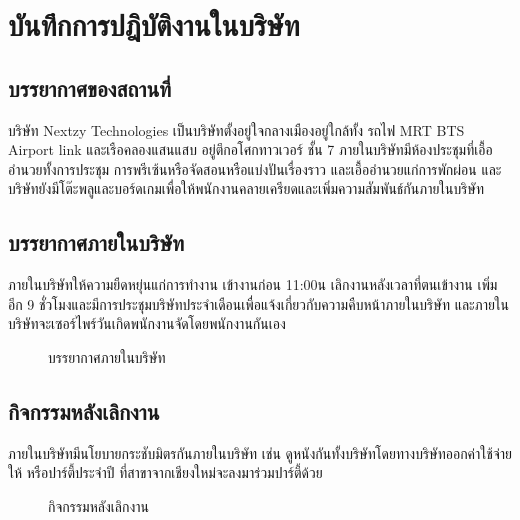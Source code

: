 \chapter{บันทึกการปฎิบัติงานในบริษัท}
\label{chapter:atmosphere}
\section{บรรยากาศของสถานที่}
บริษัท Nextzy Technologies เป็นบริษัทตั้งอยู่ใจกลางเมืองอยู่ใกล้ทั้ง รถไฟ MRT BTS Airport link และเรือคลองแสนแสบ
อยู่ตึกอโศกทาวเวอร์ ชั้น 7 ภายในบริษัทมีห้องประชุมที่เอื้ออำนวยทั้งการประชุม การพรีเซ้นหรือจัดสอนหรือแบ่งปันเรื่องราว 
และเอื้ออำนวยแก่การพักผ่อน และบริษัทยังมีโต๊ะพลูและบอร์ดเกมเพื่อให้พนักงานคลายเครียดและเพิ่มความสัมพันธ์กันภายในบริษัท
\section{บรรยากาศภายในบริษัท}
ภายในบริษัทให้ความยืดหยุ่นแก่การทำงาน เข้างานก่อน 11:00น เลิกงานหลังเวลาที่ตนเข้างาน เพิ่มอีก 9 ชั่วโมงและมีการประชุมบริษัทประจำเดือนเพื่อแจ้งเกี่ยวกับความคืบหน้าภายในบริษัท 
และภายในบริษัทจะเซอร์ไพร์วันเกิดพนักงานจัดโดยพนักงานกันเอง 
\begin{figure}[]
      \centering

      \caption{บรรยากาศภายในบริษัท}
\end{figure}

\section{กิจกรรมหลังเลิกงาน}
 ภายในบริษัทมีนโยบายกระชับมิตรกันภายในบริษัท เช่น ดูหนังกันทั้งบริษัทโดยทางบริษัทออกค่าใช้จ่ายให้ หรือปาร์ตี้ประจำปี ที่สาขาจากเชียงใหม่จะลงมาร่วมปาร์ตี้ด้วย
\begin{figure}[]
      \centering
      \caption{กิจกรรมหลังเลิกงาน}
\end{figure}
